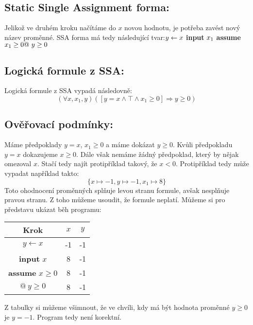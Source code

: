 \documentclass{article}
\begin{document}
\subsection{Static Single Assignment forma:}
Jelikož ve druhém kroku načítáme do $x$ novou hodnotu, je potřeba zavést nový název proměnné. SSA forma má tedy následující tvar:\newline\newline $y \leftarrow x \newline $ \textbf{input} $ x_1  \newline$ \textbf{assume} $x_1 \geq 0 \newline @ \ y \geq 0$

\subsection{Logická formule z SSA:}
Logická formule z SSA vypadá následovně:
$$ (\forall x, x_1, y)([y = x \wedge \top \wedge x_1 \geq 0] \Rightarrow y \geq 0) $$

\subsection{Ověřovací podmínky:}
Máme předpoklady $y = x$, $x_1 \geq 0$ a máme dokázat $y \geq 0$. Kvůli předpokladu $y = x$ dokazujeme $x \geq 0$. Dále však nemáme žádný předpoklad, který by nějak omezoval $x$. Stačí tedy najít protipříklad takový, že $x < 0$. Protipříklad tedy může vypadat například takto:$$\{x \mapsto -1, y \mapsto -1, x_1 \mapsto 8 \}$$ Toto ohodnocení proměnných splňuje levou stranu formule, avšak nesplňuje pravou stranu. Z toho můžeme usoudit, že formule neplatí. Můžeme si pro představu ukázat běh programu:

\begin{table}[H]\centering

\begin{tabular}{|c|c|c|}
    
        \hline \textbf{Krok} & $x$ & $y$ \\ \hline \hline
        $y \leftarrow x$ & -1 & -1  \\ \hline
        \textbf{input} $x$ & 8 & -1  \\ \hline
        \textbf{assume} $x \geq 0$ & 8 & -1 \\ \hline
        $@ \ y \geq 0$ & 8  & -1 \\ \hline
    	
    	\end{tabular}
\end{table}

Z tabulky si můžeme všimnout, že ve chvíli, kdy má být hodnota proměnné $y \geq 0$ je $y = -1$. Program tedy není korektní.
\end{document}
